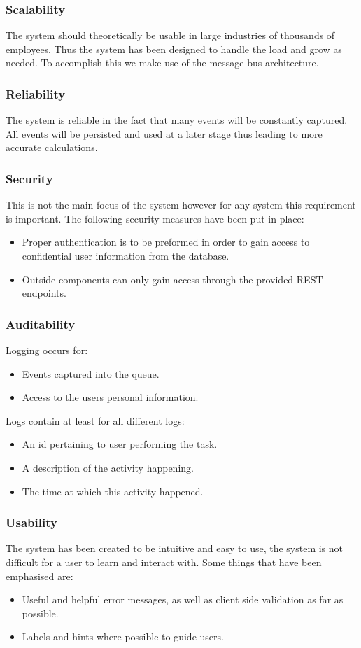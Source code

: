 \documentclass[11pt,a4paper]{article}
\begin{document}
\subsubsection{Scalability}
The system should theoretically be usable in large industries of thousands of employees. Thus the system has been designed to handle the load and grow as needed. To accomplish this we make use of the message bus architecture.

\subsubsection{Reliability}
The system is reliable in the fact that many events will be constantly captured. All events will be persisted and used at a later stage thus leading to more accurate calculations.

\subsubsection{Security}
This is not the main focus of the system however for any system this requirement is important. The following security measures have been put in place:
\begin{itemize}
	\item Proper authentication is to be preformed in order to gain access to confidential user information from the database. 
	\item Outside components can only gain access through the provided REST endpoints.
\end{itemize}

\subsubsection{Auditability}
Logging occurs for:
\begin{itemize}
	\item Events captured into the queue.
	\item Access to the users personal information.
\end{itemize}
Logs contain at least for all different logs:
\begin{itemize}
	\item An id pertaining to user performing the task.
	\item A description of the activity happening.
	\item The time at which this activity happened.
\end{itemize}

\subsubsection{Usability}
The system has been created to be intuitive and easy to use, the system is not difficult for a user to learn and interact with. Some things that have been emphasised are:
\begin{itemize}
	\item Useful and helpful error messages, as well as client side validation as far as possible.
	\item Labels and hints where possible to guide users.
\end{itemize}
\end{document}
